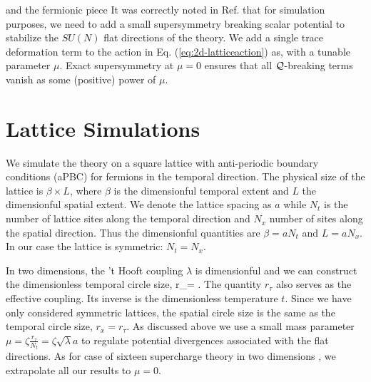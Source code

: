 
and the fermionic piece
It was correctly noted in Ref. \cite{Kanamori:2008bk} that for simulation purposes, we need to add a small supersymmetry breaking scalar potential to stabilize the $SU(N)$ flat directions of the theory. We add a single trace deformation term to the action in Eq. (\ref{eq:2d-latticeaction}) as, 
with a tunable parameter $\mu$. Exact supersymmetry at $\mu = 0$ ensures that all $\mathcal Q$-breaking terms vanish as some (positive) power of $\mu$.

\section{Lattice Simulations}
\label{sec:computation}

We simulate the theory on a square lattice with anti-periodic boundary conditions (aPBC) for fermions in the temporal direction. The physical size of the lattice is $\beta \times L$, where $\beta$ is the dimensionful temporal extent and $L$ the dimensionful spatial extent. We denote the lattice spacing as $a$ while $N_t$ is the number of lattice sites along the temporal direction and $N_x$ number of sites along the spatial direction. Thus the dimensionful quantities are $\beta = a N_t$ and $L = a N_x$. In our case the lattice is symmetric: $N_t = N_x$. 

In two dimensions, the 't Hooft coupling $\lambda$ is dimensionful and we can construct the dimensionless temporal circle size, 
\beq
r_\tau = \sqrt{\lambda} \beta.
\eeq
The quantity $r_\tau$ also serves as the effective coupling. Its inverse is the dimensionless temperature $t$. Since we have only considered symmetric lattices, the spatial circle size is the same as the temporal circle size, $r_x = r_\tau$. As discussed above we use a small mass parameter $\mu = \zeta \frac{r_\tau}{N_t} = \zeta \sqrt{\lambda} a$ to regulate potential divergences associated with the flat directions. As for case of sixteen supercharge theory in two dimensions \cite{Catterall:2017lub, Jha:2017zad}, we extrapolate all our results to $\mu = 0$.

